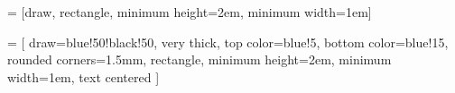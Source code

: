 
 = [draw, rectangle, minimum height=2em, minimum width=1em]

 = [
  draw=blue!50!black!50,
  very thick,
  top color=blue!5,
  bottom color=blue!15,
  rounded corners=1.5mm,
  rectangle,
  minimum height=2em,
  minimum width=1em,
  text centered
]
